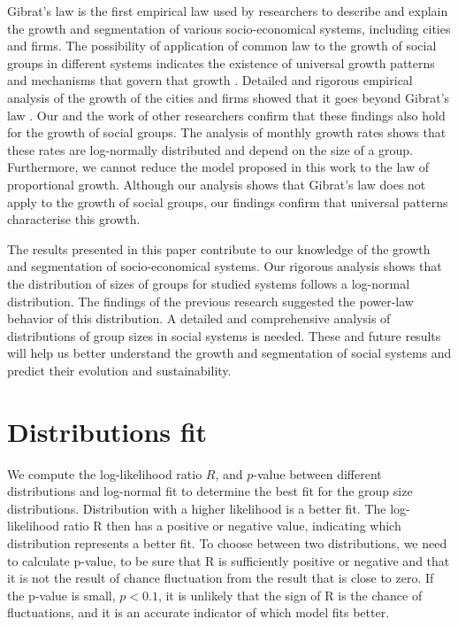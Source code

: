 Gibrat's law is the first empirical law used by researchers to describe and explain the growth and segmentation of various socio-economical systems, including cities and firms. The possibility of application of common law to the growth of social groups in different systems indicates the existence of universal growth patterns and mechanisms that govern that growth \cite{}. Detailed and rigorous empirical analysis of the growth of the cities and firms showed that it goes beyond Gibrat's law \cite{}. Our and the work of other researchers \cite{zheleva2009co} confirm that these findings also hold for the growth of social groups. The analysis of monthly growth rates shows that these rates are log-normally distributed and depend on the size of a group. Furthermore, we cannot reduce the model proposed in this work to the law of proportional growth. Although our analysis shows that Gibrat's law does not apply to the growth of social groups, our findings confirm that universal patterns characterise this growth. 

The results presented in this paper contribute to our knowledge of the growth and segmentation of socio-economical systems. Our rigorous analysis shows that the distribution of sizes of groups for studied systems follows a log-normal distribution. The findings of the previous research suggested the power-law behavior of this distribution. A detailed and comprehensive analysis of distributions of group sizes in social systems is needed. These and future results will help us better understand the growth and segmentation of social systems and predict their evolution and sustainability. 

\section{Distributions fit}

We compute the log-likelihood ratio $R$, and $p$-value between different distributions and log-normal fit \cite{clauset2009power} to determine the best fit for the group size distributions. Distribution with a higher likelihood is a better fit. The log-likelihood ratio R then has a positive or negative value, indicating which distribution represents a better fit. To choose between two distributions, we need to calculate p-value,  to be sure that R is sufficiently positive or negative and that it is not the result of chance fluctuation from the result that is close to zero. If the p-value is small, $p<0.1$, it is unlikely that the sign of R is the chance of fluctuations, and it is an accurate indicator of which model fits better. \\

